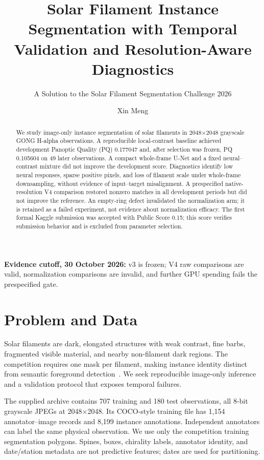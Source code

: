 \documentclass[sigconf]{acmart}
\begin{document}
\title[Temporal Validation for Solar Filament Segmentation]{Solar Filament Instance Segmentation with Temporal Validation and Resolution-Aware Diagnostics}
\subtitle{A Solution to the Solar Filament Segmentation Challenge 2026}
\author{Xin Meng}
\renewcommand{\shortauthors}{Xin Meng}
\begin{abstract}
We study image-only instance segmentation of solar filaments in 2048$\times$2048 grayscale GONG H-alpha observations. A reproducible local-contrast baseline achieved development Panoptic Quality (PQ) 0.177047 and, after selection was frozen, PQ 0.105604 on 49 later observations. A compact whole-frame U-Net and a fixed neural--contrast mixture did not improve the development score. Diagnostics identify low neural responses, sparse positive pixels, and loss of filament scale under whole-frame downsampling, without evidence of input--target misalignment. A prespecified native-resolution V4 comparison restored nonzero matches in all development periods but did not improve the reference. An empty-ring defect invalidated the normalization arm; it is retained as a failed experiment, not evidence about normalization efficacy. The first formal Kaggle submission was accepted with Public Score 0.15; this score verifies submission behavior and is excluded from parameter selection.
\end{abstract}
\maketitle
\noindent\textbf{Evidence cutoff, 30 October 2026:} v3 is frozen; V4 raw comparisons are valid, normalization comparisons are invalid, and further GPU spending fails the prespecified gate.

\section{Problem and Data}
Solar filaments are dark, elongated structures with weak contrast, fine barbs, fragmented visible material, and nearby non-filament dark regions. The competition requires one mask per filament, making instance identity distinct from semantic foreground detection~\cite{competition}. We seek reproducible image-only inference and a validation protocol that exposes temporal failures.

The supplied archive contains 707 training and 180 test observations, all 8-bit grayscale JPEGs at 2048$\times$2048. Its COCO-style training file has 1,154 annotator--image records and 8,199 instance annotations. Independent annotators can label the same physical observation. We use only the competition training segmentation polygons. Spines, boxes, chirality labels, annotator identity, and date/station metadata are not predictive features; dates are used for partitioning.
\end{document}
